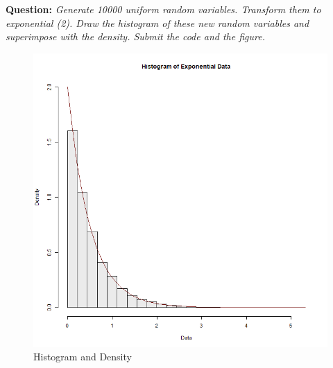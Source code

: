 \documentclass[12pt,letterpaper]{article}
\begin{document}
\textbf{Question:}
\textit{Generate 10000 uniform random variables. Transform them to exponential (2). Draw the histogram of these new random variables and superimpose with the density. Submit the code and the figure.}
\vspace{1em}
\begin{figure}[h]
  \centering
  \includegraphics[width=14cm]{histogram.png}
  \caption{Histogram and Density}
\end{figure}
\newpage

\end{document}
